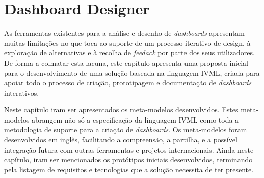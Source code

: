 
%

\chapter{Dashboard Designer}
\label{cha:dashboard_designer}



As ferramentas existentes para a análise e desenho de \textit{dashboards} apresentam muitas limitações no que toca ao suporte de um processo iterativo de design, à exploração de alternativas e à recolha de \textit{feedack} por parte dos seus utilizadores. De forma a colmatar esta lacuna, este capítulo apresenta uma proposta inicial para o desenvolvimento de uma solução baseada na linguagem \gls{IVML}, criada para apoiar todo o processo de criação, prototipagem e documentação de \textit{dashboards} interativos.

Neste capítulo iram ser apresentados os meta-modelos desenvolvidos. Estes meta-modelos abrangem não só a especificação da linguagem \gls{IVML} como toda a metodologia de suporte para a criação de \textit{dashboards}. Os meta-modelos foram desenvolvidos em inglês, facilitando a compreensão, a partilha, e a possível integração futura com outras ferramentas e projetos internacionais. Ainda neste capítulo, iram ser mencionados os protótipos iniciais desenvolvidos, terminando pela listagem de requisitos e tecnologias que a solução necessita de ter presente.

